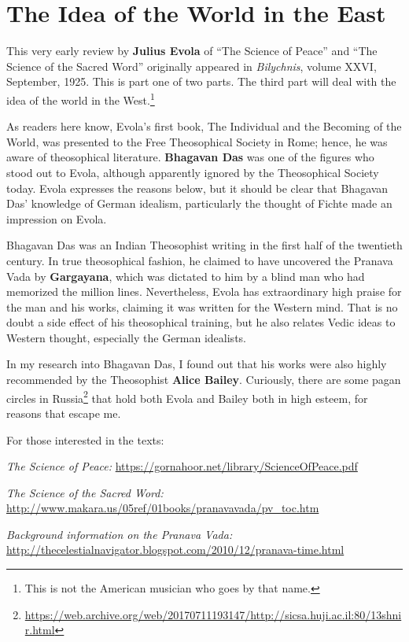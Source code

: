 \section{The Idea of the World in the East}

This very early review by \textbf{Julius Evola} of ``The Science of Peace'' and ``The Science of the Sacred Word'' originally appeared in \textit{Bilychnis}, volume XXVI, September, 1925. This is part one of two parts. The third part will deal with the idea of the world in the West.\footnote{This is not the American musician who goes by that name.}

\begin{quotationx}
As readers here know, Evola's first book, The Individual and the Becoming of the World, was presented to the Free Theosophical Society in Rome; hence, he was aware of theosophical literature. \textbf{Bhagavan Das} was one of the figures who stood out to Evola, although apparently ignored by the Theosophical Society today. Evola expresses the reasons below, but it should be clear that Bhagavan Das' knowledge of German idealism, particularly the thought of Fichte made an impression on Evola.

Bhagavan Das was an Indian Theosophist writing in the first half of the twentieth century. In true theosophical fashion, he claimed to have uncovered the Pranava Vada by \textbf{Gargayana}, which was dictated to him by a blind man who had memorized the million lines. Nevertheless, Evola has extraordinary high praise for the man and his works, claiming it was written for the Western mind. That is no doubt a side effect of his theosophical training, but he also relates Vedic ideas to Western thought, especially the German idealists.

In my research into Bhagavan Das, I found out that his works were also highly recommended by the Theosophist \textbf{Alice Bailey}. Curiously, there are some pagan circles in Russia\footnote{\url{https://web.archive.org/web/20170711193147/http://sicsa.huji.ac.il:80/13shnir.html}} that hold both Evola and Bailey both in high esteem, for reasons that escape me.

For those interested in the texts:

\textit{The Science of Peace:} \url{https://gornahoor.net/library/ScienceOfPeace.pdf}

\textit{The Science of the Sacred Word:} \url{http://www.makara.us/05ref/01books/pranavavada/pv\_toc.htm} 

\textit{Background information on the Pranava Vada:} \url{http://thecelestialnavigator.blogspot.com/2010/12/pranava-time.html}
\end{quotationx}

